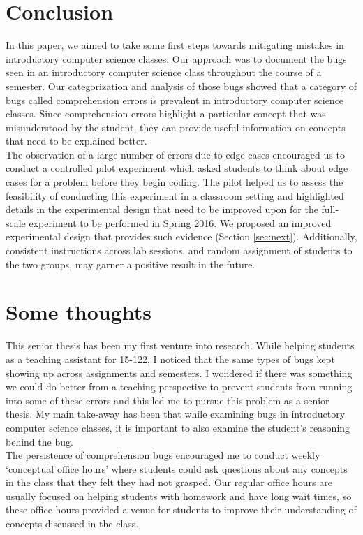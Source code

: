 \documentclass[11pt,letterpaper]{article}
\begin{document}
\section{Conclusion}

In this paper, we aimed to take some first steps towards mitigating mistakes in introductory computer science classes. Our approach was to document the bugs seen in an introductory computer science class throughout the course of a semester. Our categorization and analysis of those bugs showed that a category of bugs called comprehension errors is prevalent in introductory computer science classes. Since comprehension errors highlight a particular concept that was misunderstood by the student, they can provide useful information on concepts that need to be explained better.\\

The observation of a large number of errors due to edge cases encouraged us to conduct a controlled pilot experiment which asked students to think about edge cases for a problem before they begin coding. The pilot helped us to assess the feasibility of conducting this experiment in a classroom setting and highlighted details in the experimental design that need to be improved upon for the full-scale experiment to be performed in Spring 2016. We proposed an improved experimental design that provides such evidence (Section \ref{sec:next}). Additionally, consistent instructions across lab sessions, and random assignment of students to the two groups, may garner a positive result in the future.

\section{Some thoughts}
This senior thesis has been my first venture into research. While helping students as a teaching assistant for 15-122, I noticed that the same types of bugs kept showing up across assignments and semesters. I wondered if there was something we could do better from a teaching perspective to prevent students from running into some of these errors and this led me to pursue this problem as a senior thesis. My main take-away has been that while examining bugs in introductory computer science classes, it is important to also examine the student's reasoning behind the bug.\\

The persistence of comprehension bugs encouraged me to conduct weekly `conceptual office hours' where students could ask questions about any concepts in the class that they felt they had not grasped. Our regular office hours are usually focused on helping students with homework and have long wait times, so these office hours provided a venue for students to improve their understanding of concepts discussed in the class.\\
\end{document}
